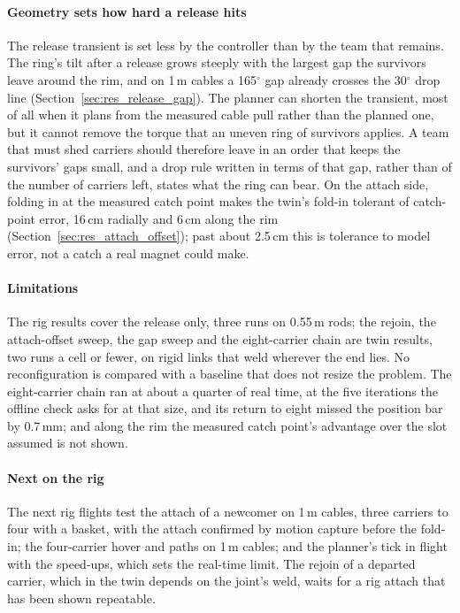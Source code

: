 \paragraph{Geometry sets how hard a release hits}
The release transient is set less by the controller than by the team that remains. The ring's tilt after a release
grows steeply with the largest gap the survivors leave around the rim, and on 1\,m cables a 165$^\circ$ gap already
crosses the 30$^\circ$ drop line (Section~\ref{sec:res_release_gap}). The planner can shorten the transient, most of
all when it plans from the measured cable pull rather than the planned one, but it cannot remove the torque that an
uneven ring of survivors applies. A team that must shed carriers should therefore leave in an order that keeps the
survivors' gaps small, and a drop rule written in terms of that gap, rather than of the number of carriers left,
states what the ring can bear. On the attach side, folding in at the measured catch point makes the twin's fold-in
tolerant of catch-point error, 16\,cm radially and 6\,cm along the rim (Section~\ref{sec:res_attach_offset}); past
about 2.5\,cm this is tolerance to model error, not a catch a real magnet could make.

\paragraph{Limitations}
The rig results cover the release only, three runs on 0.55\,m rods; the rejoin, the attach-offset sweep, the gap
sweep and the eight-carrier chain are twin results, two runs a cell or fewer, on rigid links that weld wherever the
end lies. No reconfiguration is compared with a baseline that does not resize the problem. The eight-carrier chain ran
at about a quarter of real time, at the five iterations the offline check asks for at that size, and its return to
eight missed the position bar by 0.7\,mm; and
along the rim the measured catch point's advantage over the slot assumed is not shown.

\paragraph{Next on the rig}
The next rig flights test the attach of a newcomer on 1\,m cables, three carriers to four with a basket, with the
attach confirmed by motion capture before the fold-in; the four-carrier hover and paths on 1\,m cables; and the
planner's tick in flight with the speed-ups, which sets the real-time limit. The rejoin of a departed carrier, which
in the twin depends on the joint's weld, waits for a rig attach that has been shown repeatable.

